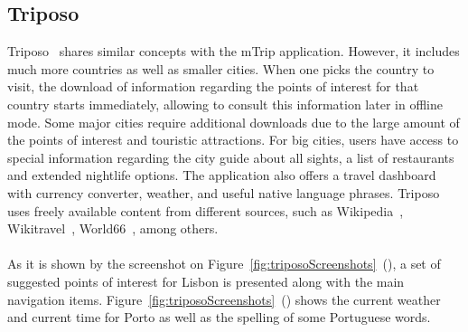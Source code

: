 \subsection{Triposo}
Triposo~\cite{triposo} shares similar concepts with the mTrip application. However, it includes much more countries as well as smaller cities. When one picks the country to visit, the download of information regarding the points of interest for that country starts immediately, allowing to consult this information later in offline mode. Some major cities require additional downloads due to the large amount of the points of interest and touristic attractions. For big cities, users have access to special information regarding the city guide about all sights, a list of restaurants and extended nightlife options. The application also offers a travel dashboard with currency converter, weather, and useful native language phrases. Triposo uses freely available content from different sources, such as Wikipedia~\cite{wikipedia}, Wikitravel~\cite{wikitravel}, World66~\cite{world66}, among others.\\
\\
As it is shown by the screenshot on Figure~\ref{fig:triposoScreenshots}~(), a set of suggested points of interest for Lisbon is presented along with the main navigation items. Figure~\ref{fig:triposoScreenshots}~() shows the current weather and current time for Porto as well as the spelling of some Portuguese words.\\

